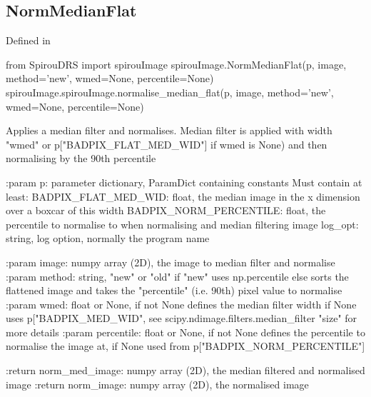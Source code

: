 \noindent\begin{minipage}{\textwidth}
\subsection{NormMedianFlat}

Defined in \spirouImage{}

\begin{pythonbox}
from SpirouDRS import spirouImage
spirouImage.NormMedianFlat(p, image, method='new', wmed=None, percentile=None)
spirouImage.spirouImage.normalise_median_flat(p, image, method='new', wmed=None, percentile=None)
\end{pythonbox}

\begin{pythondocstring}
Applies a median filter and normalises. Median filter is applied with width
"wmed" or p["BADPIX_FLAT_MED_WID"] if wmed is None) and then normalising by
the 90th percentile

:param p: parameter dictionary, ParamDict containing constants
    Must contain at least:
            BADPIX_FLAT_MED_WID: float, the median image in the x
                                 dimension over a boxcar of this width
            BADPIX_NORM_PERCENTILE: float, the percentile to normalise
                                    to when normalising and median
                                    filtering image
            log_opt: string, log option, normally the program name

:param image: numpy array (2D), the image to median filter and normalise
:param method: string, "new" or "old" if "new" uses np.percentile else
               sorts the flattened image and takes the "percentile" (i.e.
               90th) pixel value to normalise
:param wmed: float or None, if not None defines the median filter width
             if None uses p["BADPIX_MED_WID", see
             scipy.ndimage.filters.median_filter "size" for more details
:param percentile: float or None, if not None defines the percentile to
                   normalise the image at, if None used from
                   p["BADPIX_NORM_PERCENTILE"]

:return norm_med_image: numpy array (2D), the median filtered and normalised
                        image
:return norm_image: numpy array (2D), the normalised image
\end{pythondocstring}
\end{minipage}



